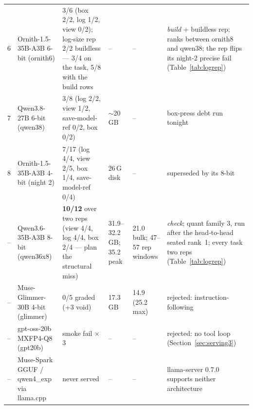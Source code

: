 \begin{table}[htbp]
{\begin{tabular}{clllll}
6 & Ornith-1.5-35B-A3B 6-bit (ornith6) & 3/6 (box 2/2, log 1/2, view 0/2); log-size rep 2/2 buildless --- 3/4 on the task, 5/8 with the build rows & -- & -- & \emph{build} + buildless rep; ranks between ornith8 and qwen38; the rep flips its night-2 precise fail (Table~\ref{tab:logrep}) \\
7 & Qwen3.8-27B 6-bit (qwen38) & 3/8 (log 2/2, view 1/2, save-model-ref 0/2, box 0/2) & ${\sim}$20\,GB & -- & box-press debt run tonight \\
8 & Ornith-1.5-35B-A3B 4-bit (night 2) & 7/17 (log 4/4, view 2/5, box 1/4, save-model-ref 0/4) & 26\,G disk & -- & superseded by its 8-bit \\
-- & Qwen3.6-35B-A3B 8-bit (qwen36x8) & \textbf{10/12} over two reps (view 4/4, log 4/4, box 2/4 --- plan the structural miss) & 31.9--32.2\,GB; 35.2 peak & 21.0 bulk; 47--57 rep windows & \emph{check}; quant family 3, run after the head-to-head seated rank~1; every task two reps (Table~\ref{tab:logrep}) \\
-- & Muse-Glimmer-30B 4-bit (glimmer) & 0/5 graded (+3 void) & 17.3\,GB & 14.9 (25.2 max) & rejected: instruction-following \\
-- & gpt-oss-20b MXFP4-Q8 (gpt20b) & smoke fail $\times$3 & -- & -- & rejected: no tool loop (Section~\ref{sec:serving3}) \\
-- & Muse-Spark GGUF / qwen4\_exp via llama.cpp & never served & -- & -- & llama-server 0.7.0 supports neither architecture \\
\bottomrule
\end{tabular}}
\end{table}

